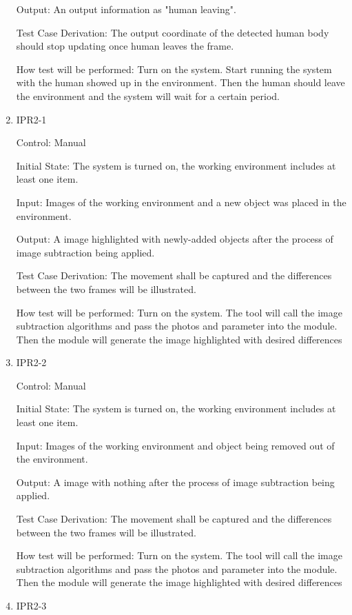 \documentclass[12pt, titlepage]{article}
\begin{document}
\begin{enumerate}
Output: An output information as "human leaving".

Test Case Derivation: The output coordinate of the detected human body should stop updating once human leaves the frame.
					
How test will be performed: Turn on the system. Start running the system with the human showed up in the environment. Then the human should leave the environment and the system will wait for a certain period.


\item{IPR2-1\\}

Control: Manual
					
Initial State: The system is turned on, the working environment includes at least one item.
					
Input: Images of the working environment and a new object was placed in the environment.
					
Output: A image highlighted with newly-added objects after the process of image subtraction being applied.

Test Case Derivation: The movement shall be captured and the differences between the two frames will be illustrated.
					
How test will be performed: Turn on the system. The tool will call the image subtraction algorithms and pass the photos and parameter into the module. Then the module will generate the image highlighted with desired differences

\item{IPR2-2\\}

Control: Manual
					
Initial State: The system is turned on, the working environment includes at least one item.
					
Input: Images of the working environment and object being removed out of the environment.
					
Output: A image with nothing after the process of image subtraction being applied.

Test Case Derivation: The movement shall be captured and the differences between the two frames will be illustrated.
					
How test will be performed: Turn on the system. The tool will call the image subtraction algorithms and pass the photos and parameter into the module. Then the module will generate the image highlighted with desired differences

\item{IPR2-3\\}


\end{enumerate}
\end{document}

